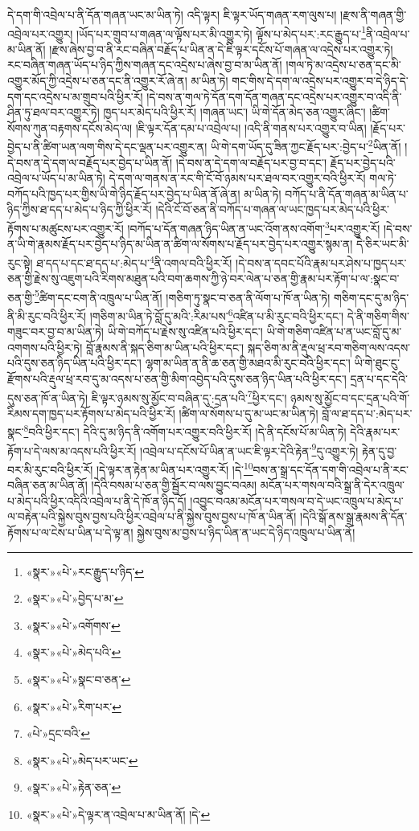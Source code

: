 དེ་དག་གི་འབྲེལ་པ་ནི་དོན་གཞན་ཡང་མ་ཡིན་ཏེ། འདི་ལྟར། ཇི་ལྟར་ཡོད་གཞན་རག་ལུས་པ། །རྫས་ནི་གཞན་གྱི་འབྲེལ་པར་འགྱུར། །ཡོད་པར་གྲུབ་པ་གཞན་ལ་ལྟོས་པར་མི་འགྱུར་ཏེ། ལྟོས་པ་མེད་པར་:རང་རྒྱུད་པ་\footnote{«སྣར་»«པེ་»རང་རྒྱུད་པ་ཉིད་}ནི་འབྲེལ་པ་མ་ཡིན་ནོ། །རྫས་ཞེས་བྱ་བ་ནི་རང་བཞིན་བརྗོད་པ་ཡིན་ན་དེ་ཇི་ལྟར་དངོས་པོ་གཞན་ལ་འདྲེས་པར་འགྱུར་ཏེ། རང་བཞིན་གཞན་ཡོད་པ་ཉིད་ཀྱིས་གཞན་དང་འདྲེས་པ་ཞེས་བྱ་བ་མ་ཡིན་ནོ། །གལ་ཏེ་མ་འདྲེས་པ་ཅན་དང་མི་འགྱུར་མོད་ཀྱི་འདྲེས་པ་ཅན་དང་ནི་འགྱུར་རོ་ཞེ་ན། མ་ཡིན་ཏེ། གང་གིས་དེ་དག་ལ་འདྲེས་པར་འགྱུར་བ་དེ་ཉིད་དེ་དག་དང་འདྲེས་པ་མ་གྲུབ་པའི་ཕྱིར་རོ། །དེ་བས་ན་གལ་ཏེ་དོན་དག་དོན་གཞན་དང་འདྲེས་པར་འགྱུར་བ་འདི་ནི་ཤིན་ཏུ་ཐལ་བར་འགྱུར་ཏེ། ཁྱད་པར་མེད་པའི་ཕྱིར་རོ། །གཞན་ཡང་། ཡི་གེ་དོན་མེད་ཅན་འགྱུར་ཞིང་། །ཚིག་སོགས་ཀུན་བརྟགས་དངོས་མེད་ལ། །ཇི་ལྟར་དོན་དམ་པ་འབྲེལ་པ། །འདི་ནི་གནས་པར་འགྱུར་བ་ཡིན། །རྗོད་པར་བྱེད་པ་ནི་ཚིག་ཡན་ལག་གིས་དེ་དང་ལྡན་པར་འགྱུར་ན། ཡི་གེ་དག་ཡོད་དུ་ཟིན་ཀྱང་རྗོད་པར་:བྱེད་པ་\footnote{«སྣར་»«པེ་»བྱེད་པ་མ་}ཡིན་ནོ། །དེ་བས་ན་དེ་དག་ལ་བརྗོད་པར་བྱེད་པ་ཡིན་ནོ། །དེ་བས་ན་དེ་དག་ལ་བརྗོད་པར་བྱ་བ་དང་། རྗོད་པར་བྱེད་པའི་འབྲེལ་པ་ཡོད་པ་མ་ཡིན་ཏེ། དེ་དག་ལ་གནས་ན་རང་གི་ངོ་བོ་ཉམས་པར་ཐལ་བར་འགྱུར་བའི་ཕྱིར་རོ། གལ་ཏེ་བཀོད་པའི་ཁྱད་པར་གྱིས་ཡི་གེ་ཉིད་རྗོད་པར་བྱེད་པ་ཡིན་ནོ་ཞེ་ན། མ་ཡིན་ཏེ། བཀོད་པ་ནི་དོན་གཞན་མ་ཡིན་པ་ཉིད་ཀྱིས་ཐ་དད་པ་མེད་པ་ཉིད་ཀྱི་ཕྱིར་རོ། །དེའི་ངོ་བོ་ཅན་ནི་བཀོད་པ་གཞན་ལ་ཡང་ཁྱད་པར་མེད་པའི་ཕྱིར་རྟོགས་པ་མཚུངས་པར་འགྱུར་རོ། །བཀོད་པ་དོན་གཞན་ཉིད་ཡིན་ན་ཡང་འོག་ནས་འགོག་\footnote{«སྣར་»«པེ་»འགོགས་}པར་འགྱུར་རོ། །དེ་བས་ན་ཡི་གེ་རྣམས་རྗོད་པར་བྱེད་པ་ཉིད་མ་ཡིན་ན་ཚིག་ལ་སོགས་པ་རྗོད་པར་བྱེད་པར་འགྱུར་སྙམ་ན། དེ་ཅིར་ཡང་མི་རུང་སྟེ། ཐ་དད་པ་དང་ཐ་དད་པ་:མེད་པ་\footnote{«སྣར་»«པེ་»མེད་པའི་}ནི་འགལ་བའི་ཕྱིར་རོ། །དེ་བས་ན་དབང་པོའི་རྣམ་པར་ཤེས་པ་ཁྱད་པར་ཅན་གྱི་རྗེས་སུ་འཇུག་པའི་རིགས་མཐུན་པའི་བག་ཆགས་ཀྱི་ཉེ་བར་ལེན་པ་ཅན་གྱི་རྣམ་པར་རྟོག་པ་ལ་:སྣང་བ་ཅན་གྱི་\footnote{«སྣར་»«པེ་»སྣང་བ་ཅན་}ཚིག་དང་ངག་ནི་འཁྲུལ་པ་ཡིན་ནོ། །གཅིག་ཏུ་སྣང་བ་ཅན་ནི་ལོག་པ་ཁོ་ན་ཡིན་ཏེ། གཅིག་དང་དུ་མ་ཉིད་ནི་མི་རུང་བའི་ཕྱིར་རོ། །གཅིག་མ་ཡིན་ཏེ་བློ་དུ་མའི་:རིམ་པས་\footnote{«སྣར་»«པེ་»རིག་པར་}འཛིན་པ་མི་རུང་བའི་ཕྱིར་དང་། དེ་ནི་གཅིག་གིས་གཟུང་བར་བྱ་བ་མ་ཡིན་ཏེ། ཡི་གེ་བཀོད་པ་རྗེས་སུ་འཛིན་པའི་ཕྱིར་དང་། ཡི་གེ་གཅིག་འཛིན་པ་ན་ཡང་བློ་དུ་མ་འགགས་པའི་ཕྱིར་ཏེ། བློ་རྣམས་ནི་སྐད་ཅིག་མ་ཡིན་པའི་ཕྱིར་དང་། སྐད་ཅིག་མ་ནི་རྡུལ་ཕྲ་རབ་གཅིག་ལས་འདས་པའི་དུས་ཅན་ཉིད་ཡིན་པའི་ཕྱིར་དང་། ལྷག་མ་ཡིན་ན་ནི་ཆ་ཅན་གྱི་མཐའ་མི་རུང་བའི་ཕྱིར་དང་། ཡི་གེ་ཐུང་ངུ་རྫོགས་པའི་རྡུལ་ཕྲ་རབ་དུ་མ་འདས་པ་ཅན་གྱི་མིག་འབྱེད་པའི་དུས་ཅན་ཉིད་ཡིན་པའི་ཕྱིར་དང་། དྲན་པ་དང་དེའི་དུས་ཅན་ཁོ་ན་ཡིན་ཏེ། ཇི་ལྟར་ཉམས་སུ་མྱོང་བ་བཞིན་དུ་:དྲན་པའི་\footnote{«པེ་»དྲང་བའི་}ཕྱིར་དང་། ཉམས་སུ་མྱོང་བ་དང་དྲན་པའི་གོ་རིམས་དག་ཁྱད་པར་རྟོགས་པ་མེད་པའི་ཕྱིར་རོ། །ཚིག་ལ་སོགས་པ་དུ་མ་ཡང་མ་ཡིན་ཏེ། བློ་ལ་ཐ་དད་པ་:མེད་པར་སྣང་\footnote{«སྣར་»«པེ་»མེད་པར་ཡང་}བའི་ཕྱིར་དང་། དེའི་དུ་མ་ཉིད་ནི་འགོག་པར་འགྱུར་བའི་ཕྱིར་རོ། །དེ་ནི་དངོས་པོ་མ་ཡིན་ཏེ། དེའི་རྣམ་པར་རྟོག་པ་དེ་ལས་མ་འདས་པའི་ཕྱིར་རོ། །འབྲེལ་པ་དངོས་པོ་ཡིན་ན་ཡང་ཇི་ལྟར་དེའི་རྟེན་\footnote{«སྣར་»«པེ་»རྟེན་ཅན་}དུ་འགྱུར་ཏེ། རྟེན་དུ་བྱ་བར་མི་རུང་བའི་ཕྱིར་རོ། །དེ་ལྟར་ན་རྟེན་མ་ཡིན་པར་འགྱུར་རོ། །དེ་\footnote{«སྣར་»«པེ་»དེ་ལྟར་ན་འབྲེལ་པ་མ་ཡིན་ནོ། །དེ་}བས་ན་སྒྲ་དང་དོན་དག་གི་འབྲེལ་པ་ནི་རང་བཞིན་ཅན་མ་ཡིན་ནོ། །དེའི་བསམ་པ་ཅན་གྱི་སྦྱོར་བ་ལས་བྱུང་བའམ། མངོན་པར་གསལ་བའི་སྒྲ་ནི་དེར་འཁྲུལ་པ་མེད་པའི་ཕྱིར་འདིའི་འབྲེལ་པ་ནི་དེ་ཁོ་ན་ཉིད་དོ། །འབྱུང་བའམ་མངོན་པར་གསལ་བ་དེ་ཡང་འཁྲུལ་པ་མེད་པ་ལ་བརྟེན་པའི་སྐྱེས་བུས་བྱས་པའི་ཕྱིར་འབྲེལ་པ་ནི་སྐྱེས་བུས་བྱས་པ་ཁོ་ན་ཡིན་ནོ། །དེའི་སྒོ་ནས་སྒྲ་རྣམས་ནི་དོན་རྟོགས་པ་ལ་ངེས་པ་ཡིན་པ་དེ་ལྟ་ན། སྐྱེས་བུས་མ་བྱས་པ་ཉིད་ཡིན་ན་ཡང་དེ་ཉིད་འཁྲུལ་པ་ཡིན་ནོ། 